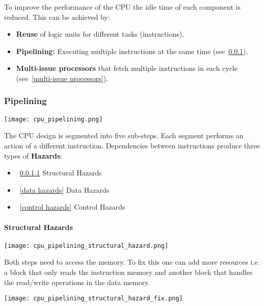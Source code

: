 \begin{multicols*}{3}
    To improve the performance of the CPU the idle time of each component is reduced. This can be achieved by:

    \begin{itemize}
        \item \textbf{Reuse} of logic units for different tasks (instructions).
        \item \textbf{Pipelining:} Executing multiple instructions at the same time (see~\ref{pipelining}).
        \item \textbf{Multi-issue processors} that fetch multiple instructions in each cycle (see~\ref{multi-issue processors}).
    \end{itemize}

    \subsubsection{Pipelining}\label{pipelining}

    \texttt{[image: cpu\_pipelining.png]}

    The CPU design is segmented into five sub-steps. Each segment performs an action of a different instruction.
    \newpar{}
    Dependencies between instructions produce three types of \textbf{Hazards}:
    \begin{itemize}
        \item~\ref{structural hazards} Structural Hazards
        \item~\ref{data hazards} Data Hazards
        \item~\ref{control hazards} Control Hazards
    \end{itemize}

    \paragraph{Structural Hazards}\label{structural hazards}

    \texttt{[image: cpu\_pipelining\_structural\_hazard.png]}

    Both steps need to access the memory. To fix this one can add more resources i.e. a block that only reads the instruction memory and another block that handles the read/write operations in the data memory.

    \begin{center}
        \texttt{[image: cpu\_pipelining\_structural\_hazard\_fix.png]}
    \end{center}


\end{multicols*}
